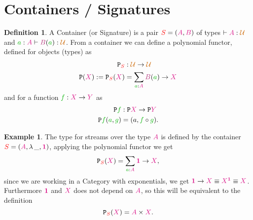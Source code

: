 \documentclass[twoside,11pt,openright]{report}
\theoremstyle{plain} %
\theoremstyle{definition}
\newtheorem{defn}{Definition}[section]
\newtheorem{exmp}{Example}[section]
\theoremstyle{remark}
\newcommand*{\term}[1]{\textcolor{green!70!black}{#1}} %
\newcommand*{\type}[1]{\textcolor{magenta!90!black}{#1}}
\newcommand*{\dependenttype}[1]{\textcolor{magenta!70!black}{#1}}
\newcommand*{\container}[1]{\textcolor{red}{#1}}
\newcommand*{\universe}[1]{\textcolor{orange!80!black}{#1}}
\newcommand*{\unit}{\type{\textbf{1}}}
\newcommand*{\functor}[1]{\ensuremath{\mathbf{\mathtt{#1}}}}
\begin{document}
\section{Containers / Signatures}
\begin{defn}
  A Container (or Signature) is a pair \(\container{S} = (\type{A},\type{B})\) of types \(\vdash \type{A} : \universe{\mathcal{U}}\) and \(\term{a} : \type{A} \vdash \dependenttype{B}(\term{a}) : \universe{\mathcal{U}}\). From a container we can define a polynomial functor, defined for objects (types) as
  \begin{equation}
    \begin{aligned}
      \functor{P}_{\container{S}} &: \universe{\mathcal{U}} \rightarrow \universe{\mathcal{U}} \\
      \functor{P}(\type{X}) := \functor{P}_{\container{S}}(\type{X}) &= \sum_{\term{a} : \type{A}} \dependenttype{B}(\term{a}) \rightarrow \type{X}
    \end{aligned}
  \end{equation}
  and for a function \(\term{f} : \type{X} \rightarrow \type{Y}\) as
  \begin{equation}
    \begin{aligned}
      \functor{P}\term{f} &: \functor{P}\type{X} \rightarrow \functor{P}\type{Y} \\
      \functor{P}\term{f}(\term{a},\term{g}) &= (a, \term{f} \circ \term{g}).
    \end{aligned}
  \end{equation}
\end{defn}
\begin{exmp}
  The type for streams over the type \(\type{A}\) is defined by the container \(\container{S} = (\type{A},\lambda\,\_, \unit)\), applying the polynomial functor we get
  \begin{equation}
    \functor{P}_{\container{S}}(\type{X}) = \sum_{\term{a} : \type{A}} \unit \rightarrow \type{X},
  \end{equation}
  since we are working in a Category with exponentials, we get \(\unit \rightarrow \type{X} \equiv \type{X}^{\unit} \equiv \type{X}\). Furthermore \(\unit\) and \(\type{X}\) does not depend on \(\type{A}\), so this will be equivalent to the definition
  \begin{equation}
    \functor{P}_{\container{S}}(\type{X}) = \type{A} \times \type{X}.
  \end{equation}
\end{exmp}
\end{document}
